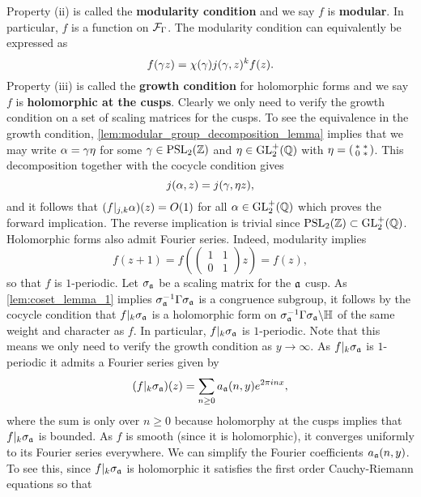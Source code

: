     Property (ii) is called the \textbf{modularity condition} and we say $f$ is \textbf{modular}. In particular, $f$ is a function on $\mathcal{F}_{\Gamma}$. The modularity condition can equivalently be expressed as
    \[
      f(\gamma z) = \chi(\gamma)j(\gamma,z)^{k}f(z).
    \]
    Property (iii) is called the \textbf{growth condition} for holomorphic forms and we say $f$ is \textbf{holomorphic at the cusps}. Clearly we only need to verify the growth condition on a set of scaling matrices for the cusps. To see the equivalence in the growth condition, \cref{lem:modular_group_decomposition_lemma} implies that we may write $\alpha = \gamma\eta$ for some $\gamma \in \mathrm{PSL}_{2}(\mathbb{Z})$ and $\eta \in \mathrm{GL}_{2}^{+}(\mathbb{Q})$ with $\eta = \begin{psmallmatrix} \ast & \ast \\ 0 & \ast \end{psmallmatrix}$. This decomposition together with the cocycle condition gives
    \[
      j(\alpha,z) = j(\gamma,\eta z),
    \]
    and it follows that $(f|_{j,k}\alpha)(z) = O(1)$ for all $\alpha \in \mathrm{GL}_{2}^{+}(\mathbb{Q})$ which proves the forward implication. The reverse implication is trivial since $\mathrm{PSL}_{2}(\mathbb{Z}) \subset \mathrm{GL}_{2}^{+}(\mathbb{Q})$. Holomorphic forms also admit Fourier series. Indeed, modularity implies
    \[
      f(z+1) = f\left(\begin{pmatrix} 1 & 1 \\ 0 & 1 \end{pmatrix}z\right) = f(z),
    \]
    so that $f$ is $1$-periodic. Let $\sigma_{\mathfrak{a}}$ be a scaling matrix for the $\mathfrak{a}$ cusp. As \cref{lem:coset_lemma_1} implies $\sigma_{\mathfrak{a}}^{-1}\Gamma\sigma_{\mathfrak{a}}$ is a congruence subgroup, it follows by the cocycle condition that $f|_{k}\sigma_{\mathfrak{a}}$ is a holomorphic form on $\sigma_{\mathfrak{a}}^{-1}\Gamma\sigma_{\mathfrak{a}}\backslash\mathbb{H}$ of the same weight and character as $f$. In particular, $f|_{k}\sigma_{\mathfrak{a}}$ is $1$-periodic. Note that this means we only need to verify the growth condition as $y \to \infty$. As $f|_{k}\sigma_{\mathfrak{a}}$ is $1$-periodic it admits a Fourier series given by
    \[
      (f|_{k}\sigma_{\mathfrak{a}})(z) = \sum_{n \ge 0}a_{\mathfrak{a}}(n,y)e^{2\pi inx},
    \]
    where the sum is only over $n \ge 0$ because holomorphy at the cusps implies that $f|_{k}\sigma_{\mathfrak{a}}$ is bounded. As $f$ is smooth (since it is holomorphic), it converges uniformly to its Fourier series everywhere. We can simplify the Fourier coefficients $a_{\mathfrak{a}}(n,y)$. To see this, since $f|_{k}\sigma_{\mathfrak{a}}$ is holomorphic it satisfies the first order Cauchy-Riemann equations so that
